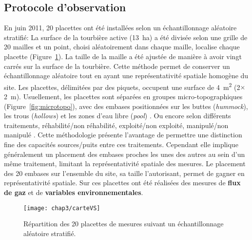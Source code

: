 \subsection{Protocole d'observation}

En juin 2011, 20 placettes ont été installées selon un échantillonnage aléatoire stratifié:
La surface de la tourbière active (\SI{13}{\hectare}) a été divisée selon une grille de 20 mailles et un point, choisi aléatoirement dans chaque maille, localise chaque placette (Figure~\ref{fig:carteVS}).
La taille de la maille a été ajustée de manière à avoir vingt carrés sur la surface de la tourbière.
Cette méthode permet de conserver un échantillonnage aléatoire tout en ayant une représentativité spatiale homogène du site. 
Les placettes, délimitées par des piquets, occupent une surface de \SI{4}{\square\metre} (2$\times$\SI{2}{\metre}).
Usuellement, les placettes sont séparées en groupes micro-topographiques (Figure~\ref{fig:microtopo}), avec des embases positionnées sur les buttes (\textit{hummock}), les trous (\textit{hollows}) et les zones d'eau libre (\textit{pool}) \citep{Alm1997,waddington2000}.
Ou encore selon différents traitements, réhabilité/non réhabilité, exploité/non exploité, manipulé/non manipulé \citep{bortoluzzi2006a,strack2013}.
Cette méthodologie présente l'avantage de permettre une distinction fine des capacités sources/puits entre ces traitements.
Cependant elle implique généralement un placement des embases proches les unes des autres au sein d'un même traitement, limitant la représentativité spatiale des mesures.
Le placement des 20 embases sur l'ensemble du site, sa taille l'autorisant, permet de gagner en représentativité spatiale.
Sur ces placettes ont été réalisées des mesures de \textbf{flux de gaz} et de \textbf{variables environnementales}.

\begin{figure}
\centering
\texttt{[image: chap3/carteVS]}
\caption{Répartition des 20 placettes de mesures suivant un échantillonnage aléatoire stratifié.}
\label{fig:carteVS}
\end{figure}

